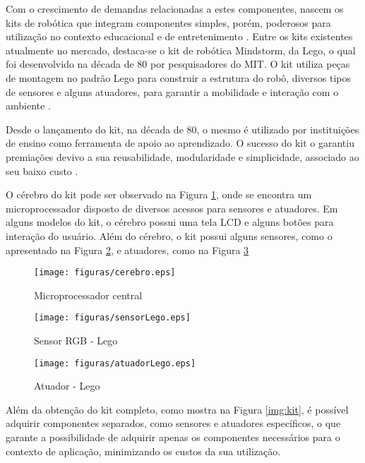 Com o crescimento de demandas relacionadas a estes componentes, nascem os kits de robótica que integram componentes simples, porém, poderosos para utilização no contexto educacional e de entretenimento \cite{teachingWithRoboticKit}. Entre os kits existentes atualmente no mercado, destaca-se o kit de robótica Mindstorm, da Lego, o qual foi desenvolvido na década de 80 por pesquisadores do MIT. O kit utiliza peças de montagem no padrão Lego para construir a estrutura do robô, diversos tipos de sensores e alguns atuadores, para garantir a mobilidade e interação com o ambiente \cite{teachingWithRoboticKit}.

Desde o lançamento do kit, na década de 80, o mesmo é utilizado por instituições de ensino como ferramenta de apoio ao aprendizado. O sucesso do kit o garantiu premiações devivo a sua reusabilidade, modularidade e simplicidade, associado ao seu baixo custo \cite{teachingWithRoboticKit}.

O cérebro do kit pode ser observado na Figura \ref{img:cerebro}, onde se encontra um microprocessador disposto de diversos acessos para sensores e atuadores. Em alguns modelos do kit, o cérebro possui uma tela LCD e alguns botões para interação do usuário. Além do cérebro, o kit possui alguns sensores, como o apresentado na Figura \ref{img:sensorLego}, e atuadores, como na Figura \ref{img:atuadorLego}

\begin{figure}[H]
	\centering
	\texttt{[image: figuras/cerebro.eps]}
	\label{img:cerebro}
	\caption[Microprocessador central]{Microprocessador central}
\end{figure}	

\begin{figure}[H]
	\centering
	\texttt{[image: figuras/sensorLego.eps]}
	\caption[Sensor RGB - Lego]{Sensor RGB - Lego}
	\label{img:sensorLego}
\end{figure}	

\begin{figure}[H]
	\centering
	\texttt{[image: figuras/atuadorLego.eps]}
	\caption[Atuador - Lego]{Atuador - Lego}
	\label{img:atuadorLego}
\end{figure}

Além da obtenção do kit completo, como mostra na Figura \ref{img:kit}, é possível adquirir componentes separados, como sensores e atuadores específicos, o que garante a possibilidade de adquirir apenas os componentes necessários para o contexto de aplicação, minimizando os custos da sua utilização.

